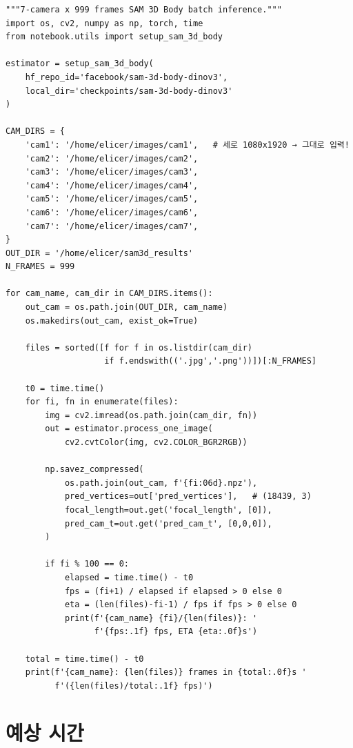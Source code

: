 \documentclass[11pt, a4paper]{report}
\begin{document}
\begin{codebox}[title={run\_sam3d\_7cam.py}]
\begin{verbatim}
"""7-camera x 999 frames SAM 3D Body batch inference."""
import os, cv2, numpy as np, torch, time
from notebook.utils import setup_sam_3d_body

estimator = setup_sam_3d_body(
    hf_repo_id='facebook/sam-3d-body-dinov3',
    local_dir='checkpoints/sam-3d-body-dinov3'
)

CAM_DIRS = {
    'cam1': '/home/elicer/images/cam1',   # 세로 1080x1920 → 그대로 입력!
    'cam2': '/home/elicer/images/cam2',
    'cam3': '/home/elicer/images/cam3',
    'cam4': '/home/elicer/images/cam4',
    'cam5': '/home/elicer/images/cam5',
    'cam6': '/home/elicer/images/cam6',
    'cam7': '/home/elicer/images/cam7',
}
OUT_DIR = '/home/elicer/sam3d_results'
N_FRAMES = 999

for cam_name, cam_dir in CAM_DIRS.items():
    out_cam = os.path.join(OUT_DIR, cam_name)
    os.makedirs(out_cam, exist_ok=True)

    files = sorted([f for f in os.listdir(cam_dir)
                    if f.endswith(('.jpg','.png'))])[:N_FRAMES]

    t0 = time.time()
    for fi, fn in enumerate(files):
        img = cv2.imread(os.path.join(cam_dir, fn))
        out = estimator.process_one_image(
            cv2.cvtColor(img, cv2.COLOR_BGR2RGB))

        np.savez_compressed(
            os.path.join(out_cam, f'{fi:06d}.npz'),
            pred_vertices=out['pred_vertices'],   # (18439, 3)
            focal_length=out.get('focal_length', [0]),
            pred_cam_t=out.get('pred_cam_t', [0,0,0]),
        )

        if fi % 100 == 0:
            elapsed = time.time() - t0
            fps = (fi+1) / elapsed if elapsed > 0 else 0
            eta = (len(files)-fi-1) / fps if fps > 0 else 0
            print(f'{cam_name} {fi}/{len(files)}: '
                  f'{fps:.1f} fps, ETA {eta:.0f}s')

    total = time.time() - t0
    print(f'{cam_name}: {len(files)} frames in {total:.0f}s '
          f'({len(files)/total:.1f} fps)')
\end{verbatim}
\end{codebox}

\section{예상 시간}
\end{document}
